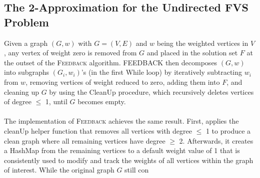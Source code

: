
\subsection{The 2-Approximation for the Undirected FVS Problem}%
Given a graph $(G, w)$ with $G = (V,E)$ and $w$ being the weighted vertices in $V$, any vertex of weight zero is removed from $G$ and placed in the solution set $F$ at the outset of the \textsc{Feedback} algorithm. \textsc{FEEDBACK} then decomposes $(G, w)$ into subgraphs $(G_i, w_i)$’s (in the first While loop) by iteratively subtracting $w_i$ from $w$, removing vertices of weight reduced to zero, adding them into $F$, and cleaning up $G$ by using the CleanUp procedure, which recursively deletes vertices of degree $\leq$ 1, until $G$ becomes empty.\\\\
The implementation of \textsc{Feedback} achieves the same result. First, applies the cleanUp helper function that removes all vertices with degree $\leq$ 1 to produce a clean graph where all remaining vertices have degree $\geq$ 2. Afterwards, it creates a HashMap from the remaining vertices to a default weight value of 1 that is consistently used to modify and track the weights of all vertices within the graph of interest. While the original graph $G$ still con %

